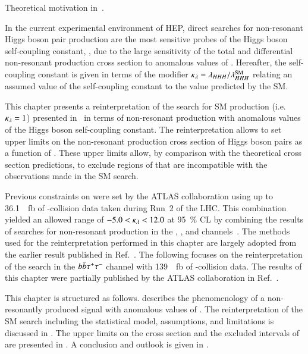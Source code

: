 Theoretical motivation in~.



In the current experimental environment of HEP, direct searches for
non-resonant Higgs boson pair production are the most sensitive probes
of the Higgs boson self-coupling constant, \lambdahhh, due to the
large sensitivity of the total and differential non-resonant \HH
production cross section to anomalous values of \lambdahhh. Hereafter,
the self-coupling constant is given in terms of the modifier
$\kappa_{\lambda} = \lambda_{HHH} / \lambda_{HHH}^{\text{SM}}$ relating an assumed
value of the self-coupling constant to the value predicted by the SM.

This chapter presents a reinterpretation of the search for SM \HH
production (i.e.\ $\kappa_{\lambda} = 1$) presented in~ in
terms of non-resonant \HH production with anomalous values of the
Higgs boson self-coupling constant. The reinterpretation allows to set
upper limits on the non-resonant production cross section of Higgs
boson pairs as a function of \klambda. These upper limits allow, by
comparison with the theoretical cross section predictions, to exclude
regions of \klambda that are incompatible with the observations made
in the SM \HH search.

Previous constraints on \klambda were set by the ATLAS collaboration
using up to \SI{36.1}{\per\femto\barn} of \pp-collision data taken
during Run~2 of the LHC. This combination yielded an allowed range of
$-5.0 < \kappa_{\lambda} < 12.0$ at \SI{95}{\percent} CL by combining the
results of searches for non-resonant \HH production in the \bbtautau,
\bbbb, and \bbyy channels~\cite{HDBS-2018-58}. The methods used for
the reinterpretation performed in this chapter are largely adopted
from the earlier result published in Ref.~\cite{HDBS-2018-58}. The
following focuses on the reinterpretation of the search in the
$b\bar{b}\tau^{+} \tau^{-}$ channel with \SI{139}{\per\femto\barn} of
\pp-collision data. The results of this chapter were partially
published by the ATLAS collaboration in
Ref.~\cite{ATLAS-CONF-2021-052}.

This chapter is structured as follows. 
describes the phenomenology of a non-resonantly produced \HH signal
with anomalous values of \klambda. The reinterpretation of the SM \HH
search including the statistical model, assumptions, and limitations
is discussed in . The upper limits on the
cross section and the excluded intervals of \klambda are presented in
. A conclusion and outlook is given
in .


